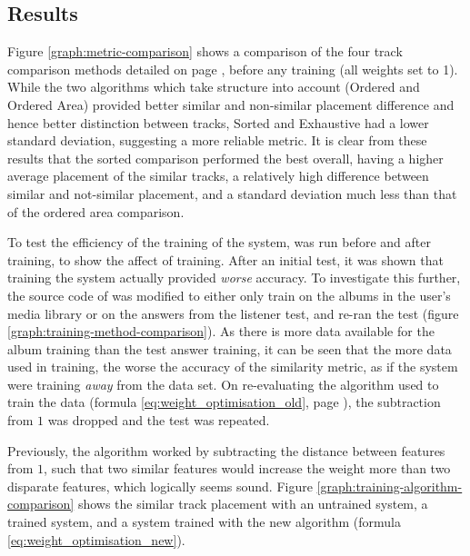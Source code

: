 \subsection{Results}
Figure \ref{graph:metric-comparison} shows a comparison of the four track comparison methods detailed on page \pageref{text:method:comparison_methods}, before any training (all weights set to 1). While the two algorithms which take structure into account (Ordered and Ordered Area) provided better similar and non-similar placement difference and hence better distinction between tracks, Sorted and Exhaustive had a lower standard deviation, suggesting a more reliable metric. It is clear from these results that the sorted comparison performed the best overall, having a higher average placement of the similar tracks, a relatively high difference between similar and not-similar placement, and a standard deviation much less than that of the ordered area comparison.

To test the efficiency of the training of the system,  was run before and after training, to show the affect of training. After an initial test, it was shown that training the system actually provided \emph{worse} accuracy.  To investigate this further, the source code of  was modified to either only train on the albums in the user's media library or on the answers from the listener test, and re-ran the test (figure \ref{graph:training-method-comparison}). As there is more data available for the album training than the test answer training, it can be seen that the more data used in training, the worse the accuracy of the similarity metric, as if the system were training \emph{away} from the data set. On re-evaluating the algorithm used to train the data (formula \ref{eq:weight_optimisation_old}, page \pageref{eq:weight_optimisation_old}), the subtraction from $1$ was dropped and the test was repeated. 

Previously, the algorithm worked by subtracting the distance between features from $1$, such that two similar features would increase the weight more than two disparate features, which logically seems sound. Figure \ref{graph:training-algorithm-comparison} shows the similar track placement with an untrained system, a trained system, and a system trained with the new algorithm (formula \ref{eq:weight_optimisation_new}).


